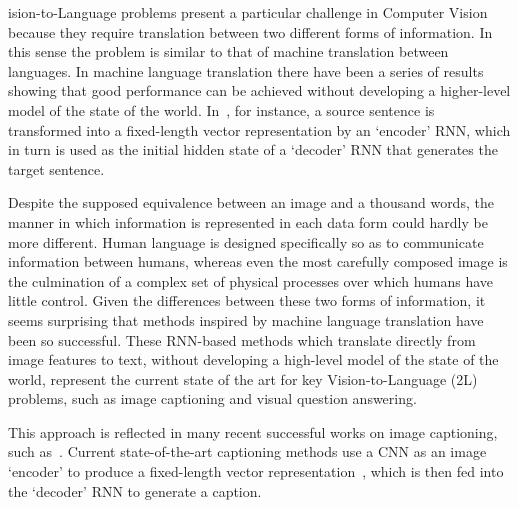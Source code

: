 ision-to-Language problems present a particular challenge in Computer Vision because they require translation between two different forms of information.  In this sense the problem is similar to that of machine translation between languages. In machine language translation there have been a series of results showing that good performance can be achieved without developing a higher-level model of the state of the world. In~\cite{bahdanau2014neural,cho2014learning,sutskever2014sequence}, for instance, a source sentence is transformed into a fixed-length vector representation by an `encoder' RNN, which in turn is used as the initial hidden state of a `decoder' RNN that generates the target sentence.

Despite the supposed equivalence between an image and  a thousand words, the
manner in which information is represented in each data form could hardly be
more different. Human language is designed specifically so as to communicate
information between humans, whereas even the most carefully composed image is
the culmination of a complex set of physical processes over which humans have
little control.  Given the differences between these two forms of information,
it seems surprising that methods inspired by machine language translation have
been so successful. These RNN-based methods which translate directly from image
features to text, without developing a high-level model of the state of the
world, represent the current state of the art for key Vision-to-Language (\V2L)
problems, such as image captioning and visual question answering.

This approach is reflected in many recent successful works on image captioning, such as~\cite{Chen2015CVPRMind,donahue2014long,karpathy2014deep,mao2014deep,vinyals2014show,yao2015describing,devlin2015language}.
Current state-of-the-art captioning methods use a CNN as an image `encoder' to produce a fixed-length vector representation~\cite{krizhevsky2012imagenet,lecun1998gradient,simonyan2014very,szegedy2014going}, which is then fed into the `decoder' RNN to generate a caption.

